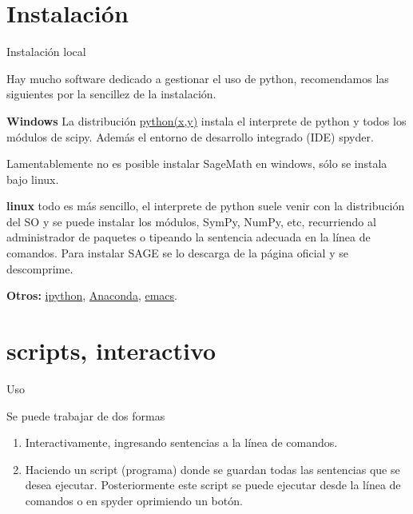 \documentclass[hyperref={colorlinks=true}]{beamer}
\begin{document}
\section{Instalación} 
\begin{frame}{Instalación local}

Hay mucho software dedicado a gestionar el uso de python, recomendamos las siguientes por la sencillez de la instalación.  

\textbf{Windows} La distribución  \href{https://code.google.com/p/pythonxy/}{python(x,y)}  instala el interprete de python y todos los módulos de scipy. Además el entorno de desarrollo integrado (IDE) spyder. 

Lamentablemente no es posible instalar SageMath en windows, sólo se instala bajo linux.

\textbf{linux} todo es más sencillo, el interprete de python suele venir con la distribución del SO y se puede instalar los módulos, SymPy, NumPy, etc, recurriendo al administrador de paquetes o tipeando la sentencia adecuada en la línea de comandos.  Para instalar SAGE se lo descarga de la página oficial y se descomprime.

\textbf{Otros:} \href{http://ipython.org}{ipython}, \href{http://continuum.io/downloads}{Anaconda}, \href{http://www.gnu.org/software/emacs/}{emacs}.
\end{frame}

\section{scripts, interactivo}
\begin{frame}{Uso}

\onslide<+->Se puede trabajar de dos formas

\begin{enumerate}
\item<+-> Interactivamente, ingresando sentencias a la línea de comandos.

\item<+-> Haciendo un script (programa) donde se guardan todas las sentencias que se desea ejecutar. Posteriormente este script se puede ejecutar desde la línea de comandos o en spyder oprimiendo un botón.

\end{enumerate}



\end{frame}
\end{document}
